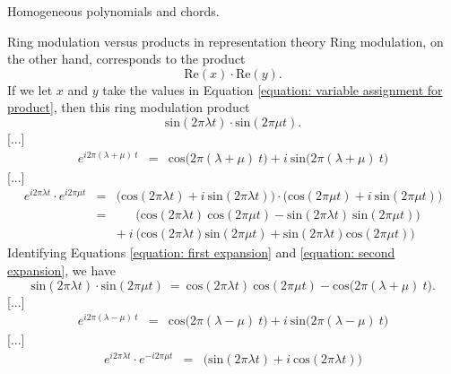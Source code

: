 \documentclass[letterpaper,11pt, reqno]{amsart}
\newtheorem{monodromy theorem}{Monodromy Theorem}[subsection]
\newtheorem{wild conjecture}[theorem]{Wild Conjecture}
\newtheorem{research objectives}{Research objectives}[subsection]
\newtheorem{research question}[theorem]{Research questions}
\newtheorem{aside question}[theorem]{Aside question}
\newtheorem{audio example}[theorem]{\loudspeaker[3] Example}
\newtheorem{blank remark}[theorem]{}
\newtheorem{terminology and comment}[theorem]{Terminology and comment}
\newtheorem{purity hypothesis}[theorem]{Purity hypothesis}
\newtheorem{corollary of the purity hypothesis}[theorem]{Corollary of the purity hypothesis}
\numberwithin{equation}{theorem}
\begin{document}
\begin{section}{Homogeneous polynomials and chords.}
\begin{subsection}{Ring modulation versus products in representation theory}
	Ring modulation, on the other hand, corresponds to the product
	$$
	\text{Re}(x)\cdot\text{Re}(y).
	$$
If we let $x$ and $y$ take the values in Equation \ref{equation: variable assignment for product}, then this ring modulation product
	$$
	\text{sin}(2\pi\lambda t)\cdot\text{sin}(2\pi\mu t).
	$$
[...]
	\begin{equation}\label{equation: first expansion}
	\begin{array}{rcl}
	e^{i2\pi(\lambda+\mu)\ \!t}
	& \!\!=\!\!
	& \text{cos}\big(2\pi(\lambda+\mu)\ \!t\big)+i\ \text{sin}\big(2\pi(\lambda+\mu)\ \!t\big)
	\end{array}
	\end{equation}
[...]
	\begin{equation}\label{equation: second expansion}
	\begin{array}{rcl}
	e^{i2\pi\lambda t}\cdot e^{i2\pi\mu t}
	& \!\!=\!\!
	& \big(\text{cos}(2\pi\lambda t)+i\ \text{sin}(2\pi\lambda t)\big)
	\cdot
	\big(\text{cos}(2\pi\mu t)+i\ \text{sin}(2\pi\mu t)\big)
	\\[6pt]
	& \!\!=\!\!
	& \ \ \ \ \ \ \ \!\big(
	\text{cos}(2\pi\lambda t)\ \!\text{cos}(2\pi\mu t)
	-
	\text{sin}(2\pi\lambda t)\ \!\text{sin}(2\pi\mu t)
	\big)
	\\[6pt]
	&
	& 
	+\ i\ 
	\big(\text{cos}(2\pi\lambda t)\text{sin}(2\pi\mu t)+\text{sin}(2\pi\lambda t)\text{cos}(2\pi\mu t)\big)
	\end{array}
	\end{equation}
Identifying Equations \eqref{equation: first expansion} and \eqref{equation: second expansion}, we have
	\begin{equation}\label{equation: fragment A}
	\text{sin}(2\pi\lambda t)\cdot\text{sin}(2\pi\mu t)
	\ =\ 
	\text{cos}(2\pi\lambda t)\ \!\text{cos}(2\pi\mu t)
	-
	\text{cos}\big(2\pi(\lambda+\mu)\ \!t\big).
	\end{equation}
[...]
	\begin{equation}\label{equation: third expansion}
	\begin{array}{rcl}
	e^{i2\pi(\lambda-\mu)\ \!t}
	& \!\!=\!\!
	& \text{cos}\big(2\pi(\lambda-\mu)\ \!t\big)+i\ \text{sin}\big(2\pi(\lambda-\mu)\ \!t\big)
	\end{array}
	\end{equation}
[...]	\begin{equation}\label{equation: fourth expansion}
	\begin{array}{rcl}
	e^{i2\pi\lambda t}\cdot e^{-i2\pi\mu t}
	& \!\!=\!\!
	& \big(\text{sin}(2\pi\lambda t)+i\ \text{cos}(2\pi\lambda t)\big)

\end{array}
\end{equation}
\end{subsection}
\end{section}
\end{document}
